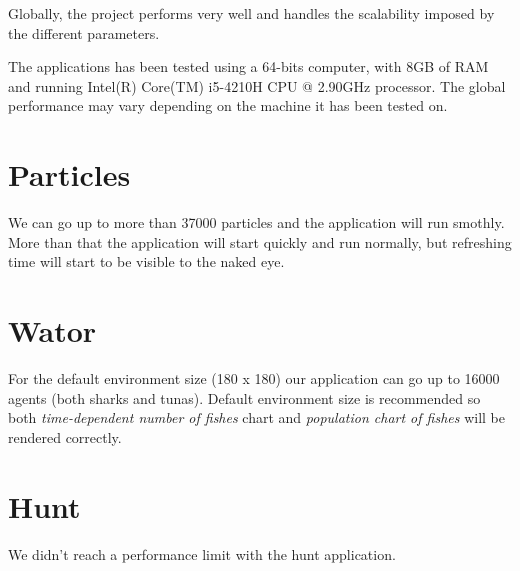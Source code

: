 Globally, the project performs very well and handles the scalability imposed by the different parameters.

The applications has been tested using a 64-bits computer, with 8GB of RAM and running Intel(R) Core(TM) i5-4210H CPU @ 2.90GHz processor. The global performance may vary depending on the machine it has been tested on.

\section{Particles}
We can go up to more than 37000 particles and the application will run smothly.\\
More than that the application will start quickly and run normally, but refreshing time will start to be visible to the naked eye.

\section{Wator}
For the default environment size (180 x 180) our application can go up to 16000 agents (both sharks and tunas). Default environment size is recommended so both \textit{time-dependent number of fishes} chart and \textit{population chart of fishes} will be rendered correctly.

\section{Hunt}
We didn't reach a performance limit with the hunt application. 